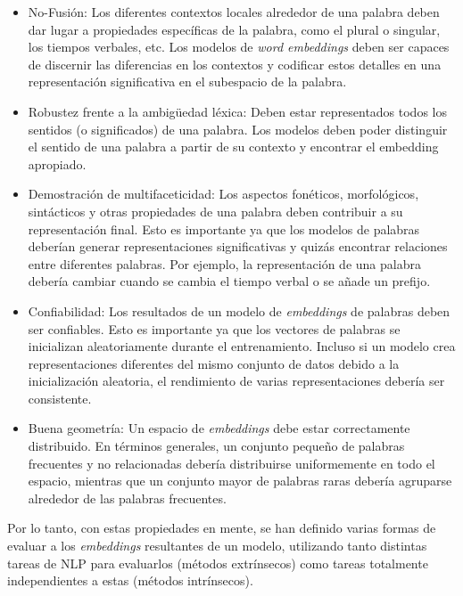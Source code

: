 \begin{itemize}
    \item No-Fusión: Los diferentes contextos locales alrededor de una palabra deben dar lugar a propiedades específicas de la palabra, como el plural o singular, los tiempos verbales, etc. Los modelos de \textit{word embeddings} deben ser capaces de discernir las diferencias en los contextos y codificar estos detalles en una representación significativa en el subespacio de la palabra. \parencite{yaghoobzadeh2016intrinsicsubspaceevaluationword}
    \item Robustez frente a la ambigüedad léxica: Deben estar representados todos los sentidos (o significados) de una palabra. Los modelos deben poder distinguir el sentido de una palabra a partir de su contexto y encontrar el embedding apropiado. \parencite{yaghoobzadeh2016intrinsicsubspaceevaluationword}
    \item Demostración de multifaceticidad: Los aspectos fonéticos, morfológicos, sintácticos y otras propiedades de una palabra deben contribuir a su representación final. Esto es importante ya que los modelos de palabras deberían generar representaciones significativas y quizás encontrar relaciones entre diferentes palabras. Por ejemplo, la representación de una palabra debería cambiar cuando se cambia el tiempo verbal o se añade un prefijo. \parencite{yaghoobzadeh2016intrinsicsubspaceevaluationword}
    \item Confiabilidad: Los resultados de un modelo de \textit{embeddings} de palabras deben ser confiables. Esto es importante ya que los vectores de palabras se inicializan aleatoriamente durante el entrenamiento. Incluso si un modelo crea representaciones diferentes del mismo conjunto de datos debido a la inicialización aleatoria, el rendimiento de varias representaciones debería ser consistente. \parencite{HellrichH17}
    \item Buena geometría: Un espacio de \textit{embeddings} debe estar correctamente distribuido. En términos generales, un conjunto pequeño de palabras frecuentes y no relacionadas debería distribuirse uniformemente en todo el espacio, mientras que un conjunto mayor de palabras raras debería agruparse alrededor de las palabras frecuentes. \parencite{GladkovaDrozd2016}
\end{itemize}

Por lo tanto, con estas propiedades en mente, se han definido varias formas de evaluar a los \textit{embeddings} resultantes de un modelo, utilizando tanto distintas tareas de NLP para evaluarlos (métodos extrínsecos) como tareas totalmente independientes a estas (métodos intrínsecos).

